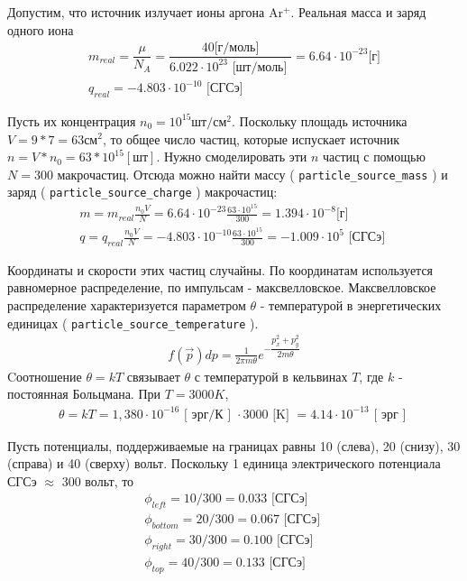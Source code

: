 Допустим, что источник излучает ионы аргона Ar$^{+}$. 
Реальная масса и заряд одного иона 
\begin{gather}
  m_{real}  
  = \dfrac{ \mu }{N_A} 
  = \dfrac{40 \mbox{[г/моль]} }{6.022 \cdot 10^{23} \mbox{ [шт/моль] } }
  = 6.64 \cdot 10^{-23} \mbox{[г]}
  \\
  q_{real} = -4.803 \cdot 10^{-10} \mbox{ [СГСэ] }
\end{gather}

Пусть их концентрация $ n_0 = 10^{15} \mbox{шт}/\mbox{см}^2$.
Поскольку площадь источника $ V = 9 * 7 = 63 \mbox{см}^2 $, то общее число частиц, которые 
испускает источник $n = V * n_0 = 63 * 10^{15} [\mbox{шт}]$.
Нужно смоделировать эти $n$ частиц с помощью $N = 300$ макрочастиц.
Отсюда можно найти массу ( \texttt{particle\_source\_mass} ) и заряд ( \texttt{particle\_source\_charge} ) макрочастиц:
\begin{gather}
  m = m_{real} \frac{ n_0 V }{ N } = 6.64 \cdot 10^{-23} \frac{63 \cdot 10^{15}}{300} = 1.394 \cdot 10^{-8} \mbox{[г]}
  \\
  q = q_{real} \frac{ n_0 V }{ N } = -4.803 \cdot 10^{-10} \frac{63 \cdot 10^{15}}{300} = -1.009 \cdot 10^{5} \mbox{ [СГСэ] }
\end{gather}

Координаты и скорости этих частиц случайны. 
По координатам используется равномерное распределение, по импульсам - максвелловское.
Максвелловское распределение характеризуется параметром $\theta$ - температурой в энергетических 
единицах ( \texttt{particle\_source\_temperature} ).
\begin{gather}
  f( \vec{p} ) dp = \frac{1}{ 2 \pi m \theta } e^{ - \dfrac{ p_x^2 + p_y^2 }{ 2 m \theta } }
\end{gather}
Cоотношение $\theta = k T$ связывает $\theta$ с температурой в кельвинах $T$, где $k$ - постоянная Больцмана.
При $T = 3000 K$, 
\begin{gather}
  \theta = kT = 1,380 \cdot 10^{-16} \mbox{ [ эрг/К ] } \cdot 3000 \mbox{ [K] } = 4.14 \cdot 10^{-13} \mbox{ [ эрг ] }
\end{gather}

Пусть потенциалы, поддерживаемые на границах равны 10 (слева), 20 (снизу), 30 (справа) и 40 (сверху) вольт.
Поскольку 1 единица электрического потенциала СГСэ $\approx$ 300 вольт, то
\begin{gather}
  \phi_{left} = 10 / 300 = 0.033 \mbox{ [СГСэ] }
  \\
  \phi_{bottom} = 20 / 300 = 0.067 \mbox{ [СГСэ] }
  \\
  \phi_{right} = 30 / 300 = 0.100 \mbox{ [СГСэ] }
  \\
  \phi_{top} = 40 / 300 = 0.133 \mbox{ [СГСэ] }
\end{gather}

